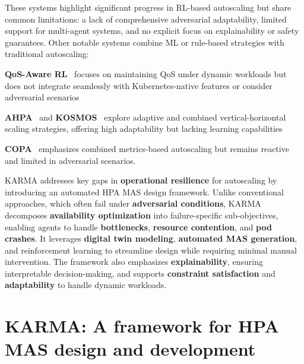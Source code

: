 \documentclass[conference]{IEEEtran}
\begin{document}
These systems highlight significant progress in RL-based autoscaling but share common limitations: a lack of comprehensive adversarial adaptability, limited support for multi-agent systems, and no explicit focus on explainability or safety guarantees.
%
Other notable systems combine ML or rule-based strategies with traditional autoscaling:
%
\begin{enumerate*}[label={}, itemjoin={;\quad }]
    \item \textbf{QoS-Aware RL}~\cite{QoSRL} focuses on maintaining QoS under dynamic workloads but does not integrate seamlessly with Kubernetes-native features or consider adversarial scenarios
    \item \textbf{AHPA}~\cite{AHPA} and \textbf{KOSMOS}~\cite{KOSMOS} explore adaptive and combined vertical-horizontal scaling strategies, offering high adaptability but lacking learning capabilities
    \item \textbf{COPA}~\cite{COPA} emphasizes combined metrics-based autoscaling but remains reactive and limited in adversarial scenarios.
\end{enumerate*}

KARMA addresses key gaps in \textbf{operational resilience} for autoscaling by introducing an automated HPA MAS design framework. Unlike conventional approaches, which often fail under \textbf{adversarial conditions}, KARMA decomposes \textbf{availability optimization} into failure-specific sub-objectives, enabling agents to handle \textbf{bottlenecks}, \textbf{resource contention}, and \textbf{pod crashes}. It leverages \textbf{digital twin modeling}, \textbf{automated MAS generation}, and reinforcement learning to streamline design while requiring minimal manual intervention. The framework also emphasizes \textbf{explainability}, ensuring interpretable decision-making, and supports \textbf{constraint satisfaction} and \textbf{adaptability} to handle dynamic workloads.


\section{KARMA: A framework for HPA MAS design and development}
\label{sec:proposed_approach}
\end{document}
